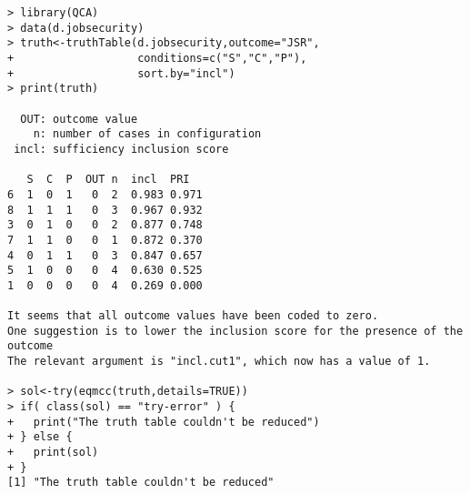 \documentclass[12pt, oneside]{amsart}   	%
\begin{document}
\begin{verbatim}
> library(QCA)
> data(d.jobsecurity)
> truth<-truthTable(d.jobsecurity,outcome="JSR",
+                   conditions=c("S","C","P"),
+                   sort.by="incl")
> print(truth)

  OUT: outcome value
    n: number of cases in configuration
 incl: sufficiency inclusion score

   S  C  P  OUT n  incl  PRI  
6  1  0  1   0  2  0.983 0.971
8  1  1  1   0  3  0.967 0.932
3  0  1  0   0  2  0.877 0.748
7  1  1  0   0  1  0.872 0.370
4  0  1  1   0  3  0.847 0.657
5  1  0  0   0  4  0.630 0.525
1  0  0  0   0  4  0.269 0.000

It seems that all outcome values have been coded to zero.
One suggestion is to lower the inclusion score for the presence of the outcome
The relevant argument is "incl.cut1", which now has a value of 1.

> sol<-try(eqmcc(truth,details=TRUE))
> if( class(sol) == "try-error" ) {
+   print("The truth table couldn't be reduced")
+ } else {  
+   print(sol)
+ }
[1] "The truth table couldn't be reduced"
\end{verbatim}
\end{document}

